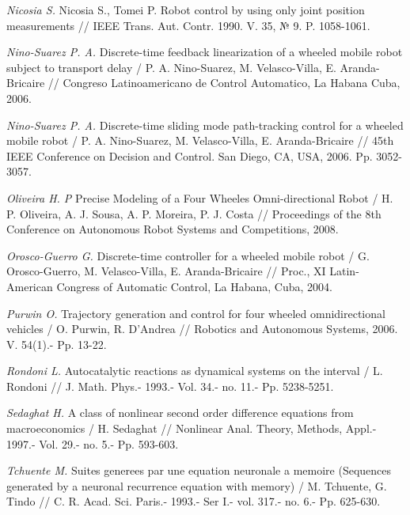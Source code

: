 \begin{thebibliography}{10}
	{\it Nicosia S.} Nicosia S., Tomei P. Robot control by using only joint position measurements // IEEE Trans. Aut. Contr. 1990. V. 35, № 9. P. 1058-1061.
	
	{\it Nino-Suarez P. A.} Discrete-time feedback linearization of a wheeled mobile robot subject to transport delay / P. A.  Nino-Suarez, M. Velasco-Villa, E. Aranda-Bricaire // Congreso Latinoamericano de Control Automatico, La Habana Cuba, 2006.
	
	{\it Nino-Suarez P. A.} Discrete-time sliding mode path-tracking control for a wheeled mobile robot / P. A.  Nino-Suarez, M. Velasco-Villa, E. Aranda-Bricaire // 45th IEEE Conference on Decision and Control. San Diego, CA, USA, 2006. Pp. 3052-3057.
	
	{\it Oliveira H. P} Precise Modeling of a Four Wheeles Omni-directional Robot / H. P. Oliveira, A. J. Sousa, A. P. Moreira, P. J. Costa // Proceedings of the 8th Conference on Autonomous Robot Systems and Competitions, 2008.
	
	{\it Orosco-Guerro G.} Discrete-time controller for a wheeled mobile robot / G. Orosco-Guerro, M. Velasco-Villa, E. Aranda-Bricaire // Proc., XI Latin-American Congress of Automatic Control, La Habana, Cuba, 2004.
	
	
	{\it Purwin O.} Trajectory generation and control for four wheeled omnidirectional vehicles / O. Purwin, R. D'Andrea // Robotics and Autonomous Systems, 2006. V. 54(1).- Pp. 13-22.
	
	{\it Rondoni L.} Autocatalytic reactions as dynamical systems on the interval / L. Rondoni // J. Math. Phys.- 1993.- Vol. 34.- no. 11.- Pp. 5238-5251.
	
	{\it Sedaghat H.} A class of nonlinear second order difference equations from macroeconomics / H. Sedaghat // Nonlinear Anal. Theory, Methods, Appl.- 1997.- Vol. 29.- no. 5.- Pp. 593-603.
	
	{\it Tchuente M.} Suites generees par une equation neuronale a memoire (Sequences generated by a neuronal recurrence equation with memory) / M. Tchuente, G. Tindo // C. R. Acad. Sci. Paris.- 1993.- Ser I.- vol. 317.- no. 6.- Pp. 625-630.
	

\end{thebibliography}
